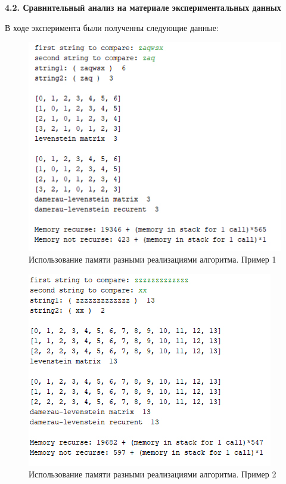\documentclass[a4paper,12pt]{report}
\begin{document}
\begin{center}
		\newpage
        \textbf{4.2. Сравнительный анализ на материале экспериментальных данных}
        \begin{flushleft}
        	В ходе эксперимента были полученны следующие данные:\\
        	\begin{figure}[h!]
        		\includegraphics[width=1\linewidth]{test7.jpg}
        		\caption{Использование памяти разными реализациями алгоритма. Пример 1}
        		\label{ris:test7}
        	\end{figure}

			\newpage
			\begin{figure}[h!]
				\includegraphics[width=1\linewidth]{test10.jpg}
				\caption{Использование памяти разными реализациями алгоритма. Пример 2}
				\label{ris:test8}
			\end{figure}
		

\end{flushleft}
\end{center}
\end{document}
